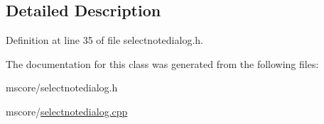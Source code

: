 \subsection{Detailed Description}


Definition at line 35 of file selectnotedialog.\+h.



The documentation for this class was generated from the following files\+:\begin{DoxyCompactItemize}
\item 
mscore/selectnotedialog.\+h\item 
mscore/\hyperlink{selectnotedialog_8cpp}{selectnotedialog.\+cpp}\end{DoxyCompactItemize}
